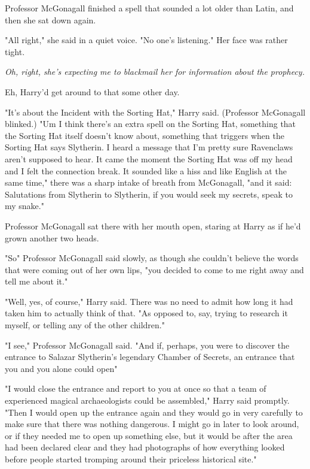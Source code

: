 Professor McGonagall finished a spell that sounded a lot older than Latin, and
then she sat down again.

"All right," she said in a quiet voice. "No one's listening." Her face was
rather tight.

\emph{Oh, right, she's expecting me to blackmail her for information about the
prophecy.}

Eh, Harry'd get around to that some other day.

"It's about the Incident with the Sorting Hat," Harry said. (Professor
McGonagall blinked.) "Um{\el} I think there's an extra spell on the Sorting
Hat, something that the Sorting Hat itself doesn't know about, something that
triggers when the Sorting Hat says Slytherin. I heard a message that I'm pretty
sure Ravenclaws aren't supposed to hear. It came the moment the Sorting Hat was
off my head and I felt the connection break. It sounded like a hiss and like
English at the same time," there was a sharp intake of breath from McGonagall,
"and it said: Salutations from Slytherin to Slytherin, if you would seek my
secrets, speak to my snake."

Professor McGonagall sat there with her mouth open, staring at Harry as if he'd
grown another two heads.

"So{\el}" Professor McGonagall said slowly, as though she couldn't believe
the words that were coming out of her own lips, "you decided to come to me
right away and tell me about it."

"Well, yes, of course," Harry said. There was no need to admit how long it had
taken him to actually think of that. "As opposed to, say, trying to research it
myself, or telling any of the other children."

"I{\el} see," Professor McGonagall said. "And if, perhaps, you were to
discover the entrance to Salazar Slytherin's legendary Chamber of Secrets, an
entrance that you and you alone could open{\el}"

"I would close the entrance and report to you at once so that a team of
experienced magical archaeologists could be assembled," Harry said promptly.
"Then I would open up the entrance again and they would go in very carefully to
make sure that there was nothing dangerous. I might go in later to look around,
or if they needed me to open up something else, but it would be after the area
had been declared clear and they had photographs of how everything looked
before people started tromping around their priceless historical site."

